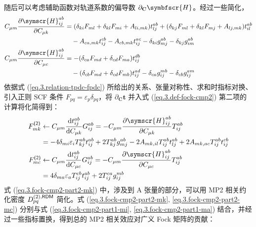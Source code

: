 随后可以考虑辅助函数对轨道系数的偏导数 $\partial_\mathbf{C} \symbfscr{H}$。经过一些简化，
\begin{subequations}
\begin{align}
    C_{\mu m} \frac{\partial \symscr{H}_{ij}^{ab}}{\partial C_{\mu k}} &= (\delta_{ki} F_{ml} + \delta_{kl} F_{mi} + A_{li, mk}) t_{lj}^{ab} + (\delta_{kj} F_{ml} + \delta_{kl} F_{mj} + A_{lj, mk}) t_{il}^{ab} \notag\\
    &\quad - A_{ca, mk} t_{ij}^{cb} - A_{cb, mk} t_{ij}^{ac} - \delta_{ki} g_{mj}^{ab} - \delta_{kj} g_{im}^{ab} \\
    C_{\mu m} \frac{\partial \symscr{H}_{ij}^{ab}}{\partial C_{\mu c}} &= - (\delta_{ca} F_{md} + \delta_{cd} F_{ma}) t_{ij}^{db} \notag\\
    &\quad - (\delta_{cb} F_{md} + \delta_{cd} F_{mb}) t_{ij}^{ad} - \delta_{ca} g_{ij}^{mb} - \delta_{cb} g_{ij}^{am}
\end{align}
\end{subequations}
依据式 (\ref{eq.3.relation-tpdc-fpdc}) 所给出的关系、张量对称性、求和时指标对换、引入正则 SCF 条件 $F_{pq} = \varepsilon_p \delta_{pq}$，将 $\partial_\mathbf{C} \mathbf{t}$ 并入式 (\ref{eq.3.def-fock-cmp2}) 第二项的计算将化简得到：
\begin{subequations}
\begin{align}
    \label{eq.3.fock-cmp2-part2-mk}
    F_{mk}^\textmt{(2)} &\leftarrow C_{\mu m} \frac{\mathrm{d} t_{ij}^{ab}}{\mathrm{d} C_{\mu k}} G_{ij}^{ab} = - C_{\mu m} \frac{\partial \symscr{H}_{ij}^{ab}}{\partial C_{\mu k}} T_{ij}^{ab} \notag\\
    &= - 4 \delta_{mi} \varepsilon_i T_{kj}^{ab} t_{ij}^{ab} + 2 T_{kj}^{ab} g_{mj}^{ab} - 2 A_{mk, il} T_{ij}^{ab} t_{lj}^{ab} + 2 A_{mk, ac} T_{ij}^{ab} t_{ij}^{cb} \\
    \label{eq.3.fock-cmp2-part2-mc}
    F_{mc}^\textmt{(2)} &\leftarrow C_{\mu m} \frac{\mathrm{d} t_{ij}^{ab}}{\mathrm{d} C_{\mu c}} G_{ij}^{ab} = - C_{\mu m} \frac{\partial \symscr{H}_{ij}^{ab}}{\partial C_{\mu c}} T_{ij}^{ab} \notag\\
    &= 4 \delta_{ma} \varepsilon_a T_{ij}^{cb} t_{ij}^{ab} + 2 T_{ij}^{ca} g_{ij}^{mb}
\end{align}
\end{subequations}
式 (\ref{eq.3.fock-cmp2-part2-mk}) 中，涉及到 A 张量的部分，可以用 MP2 相关约化密度 $D_{pq}^{(2),\textsf{RDM}}$ 简化。式 (\ref{eq.3.fock-cmp2-part2-mk}, \ref{eq.3.fock-cmp2-part2-mc}) 分别与式 (\ref{eq.3.fock-cmp2-part1-mi}, \ref{eq.3.fock-cmp2-part1-ma}) 结合，并经过一些指标置换，得到总的 MP2 相关效应对广义 Fock 矩阵的贡献：
